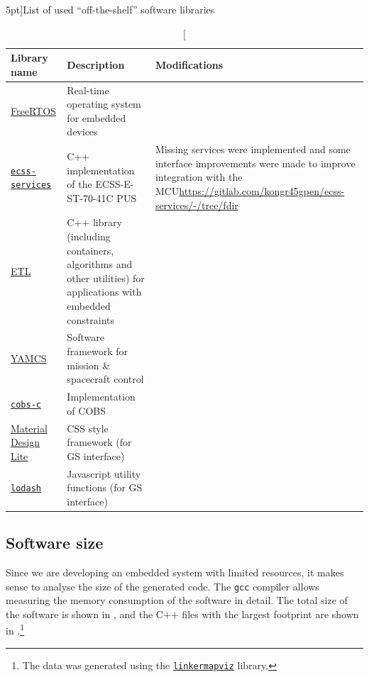 \documentclass[a4paper,nobib,final]{tufte-book}
\begin{document}
\begin{table}[h]
	\centering
	\caption[][5pt]{List of used ``off-the-shelf'' software libraries}
	\renewcommand{\arraystretch}{1.5}
	\label{tab:old_software}
	\vspace{1.3cm}
	\begin{tabularx}{\textwidth}{@{}lp{6cm}X@{}}
		\toprule
		Library name & Description & Modifications \\ \midrule
		\href{https://www.freertos.org/}{FreeRTOS} & Real-time operating system for embedded devices & \\
		\href{https://gitlab.com/acubesat/obc/ecss-services}{\texttt{ecss-services}} & C++ implementation of the ECSS-E-ST-70-41C \acl{PUS} %
		& \small Missing services were implemented and some interface improvements were made to improve integration with the \acs{MCU}\newline\small\url{https://gitlab.com/kongr45gpen/ecss-services/-/tree/fdir}
		 \\
		 \href{https://www.etlcpp.com/}{\acs{ETL}}  & C++ library (including containers, algorithms and other utilities) for applications with embedded constraints &
		 \\
 		\href{https://github.com/yamcs/yamcs}{\acs{YAMCS}}  & Software framework for mission \& spacecraft control & %
 		\\
		\href{https://github.com/cmcqueen/cobs-c}{\texttt{cobs-c}}  & Implementation of \ac{COBS} %
		 & \\
		 \href{https://getmdl.io/}{Material Design Lite} & CSS style framework (for \acs{GS} interface) & \\
		 \href{https://lodash.com/}{\texttt{lodash}} & Javascript utility functions (for \acs{GS} interface) & \\
		\bottomrule
	\end{tabularx}
\end{table}


\FloatBarrier
\subsection{Software size}

Since we are developing an embedded system with limited resources, it makes sense to analyse the size of the generated code. The \texttt{gcc} compiler allows measuring the memory consumption of the software in detail. The total size of the software is shown in , and the C++ files with the largest footprint are shown in .\footnote{The data was generated using the \href{https://github.com/PromyLOPh/linkermapviz}{\texttt{linkermapviz}} library.}
\end{document}
